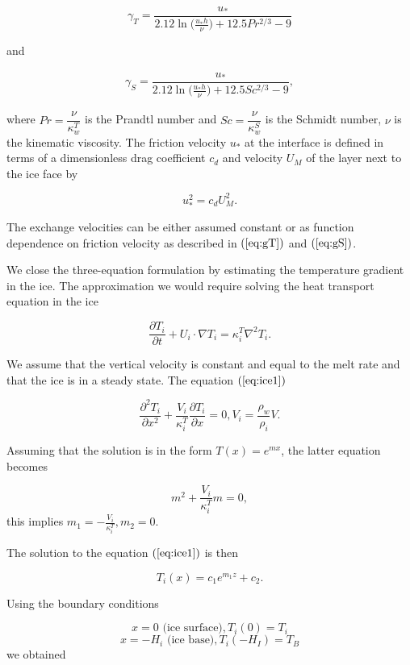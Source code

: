 \documentclass[11pt,a4paper]{article}
\begin{document}
		\begin{equation}
			\label{eq:gT}
			\gamma_{T} = \dfrac{u_*}{2.12\ln\bigg(\frac{u_*h}{\nu}\bigg)+12.5 Pr^{2/3}-9}
		\end{equation}
		
		
		and
		
		\begin{align}
			\label{eq:gS}
			\gamma_{S} = \dfrac{u_*}{2.12\ln\bigg(\frac{u_*h}{\nu}\bigg)+12.5 Sc^{2/3}-9},
		\end{align}
		 
		
		where $Pr = \dfrac{\nu}{\kappa_w^T}$ is the Prandtl number and $Sc =  \dfrac{\nu}{\kappa_w^S}$ is the Schmidt number, $\nu$ is the kinematic viscosity. The friction velocity $u_*$ at the interface is defined in terms of a dimensionless drag coefficient $c_d$ and velocity $U_M$ of the layer next to the ice face by
		
		$$u_*^2 = c_d U_M^2.$$
		
		The exchange velocities can be either assumed constant or as function dependence on friction velocity as described in $(\ref{eq:gT})$ and $(\ref{eq:gS})$.
		
		
		We close the three-equation formulation by estimating the temperature gradient in the ice. The approximation we would require solving the heat transport equation in the ice
		
		\begin{equation}
			\label{eq:ice1}
			\dfrac{\partial T_i}{\partial t} +U_i\cdot\nabla T_i = \kappa_i^T\nabla^2T_i.
		\end{equation}
		
		We assume that the vertical velocity is constant and equal to the melt rate and that the ice is in a steady state. The equation $(\ref{eq:ice1})$ 
		
		$$\dfrac{\partial^2 T_i}{\partial x^2} + \frac{V_i}{\kappa_i^T}\dfrac{\partial T_i}{\partial x} = 0, V_i = \frac{\rho_w}{\rho_i}V.$$
		
		Assuming that the solution is in the form $T(x) = e^{mx}$, the latter equation becomes 
		
		$$m^2+ \frac{V_i}{\kappa_i^T}m = 0,$$ this implies $m_1 = - \frac{V_i}{\kappa_i^T}, m_2 = 0.$
		
		The solution to the equation $(\ref{eq:ice1})$  is then 
		
		$$T_i(x) = c_1e^{m_1z}+c_2.$$
		
		Using the boundary conditions
		
		$$x = 0 \text{ (ice surface)}, T_i(0) = T_i$$
		$$x = -H_i \text{ (ice base)}, T_i(-H_I) = T_B$$ we obtained
		
\end{document}
